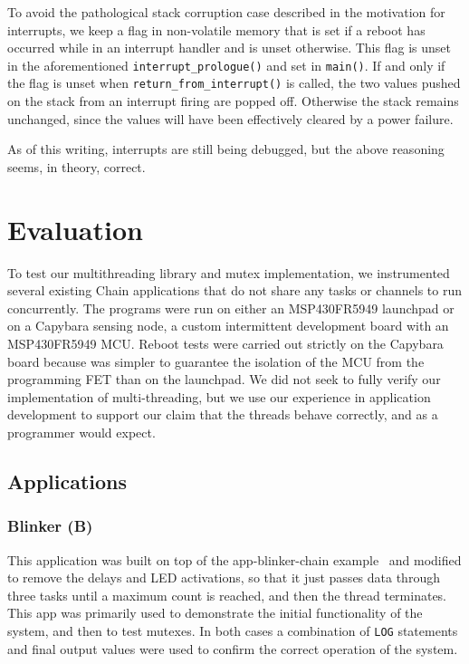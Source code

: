 \documentclass[11pt]{sensys-proc}
\begin{document}
To avoid the pathological stack corruption case described in the motivation for
interrupts, we keep a flag in non-volatile memory that is set if a reboot has
occurred while in an interrupt handler and is unset otherwise. This flag is
unset in the aforementioned \texttt{interrupt\_prologue()} and set in
\texttt{main()}. If and only if the flag is unset when
\texttt{return\_from\_interrupt()} is called, the two values pushed on the
stack from an interrupt firing are popped off. Otherwise the stack remains
unchanged, since the values will have been effectively cleared by a power
failure.


As of this writing, interrupts are still being debugged, but the above
reasoning seems, in theory, correct.


\section{Evaluation}
To test our multithreading library and mutex implementation, we instrumented
several existing Chain applications that do not share any tasks or channels to
run concurrently. The programs were run on either an MSP430FR5949 launchpad or
on a Capybara sensing node, a custom intermittent development board with an
MSP430FR5949 MCU. Reboot tests were carried out strictly on the Capybara board
because was simpler to guarantee the isolation of the MCU from the programming
FET than on the launchpad. We did not seek to fully verify our implementation
of multi-threading, but we use our experience in application development to
support our claim that the threads behave correctly, and as a programmer would
expect.

\subsection{Applications}
\subsubsection{Blinker (B)}
This application was built on top of the app-blinker-chain
example~\cite{blinker} and modified to remove the delays and LED activations, so
that it just passes data through three tasks until a maximum count is reached,
and then the thread terminates. This app was primarily used to demonstrate the
initial functionality of the system, and then to test mutexes. In both cases a
combination of \texttt{LOG} statements and final output values were used to
confirm the correct operation of the system.
\end{document}

